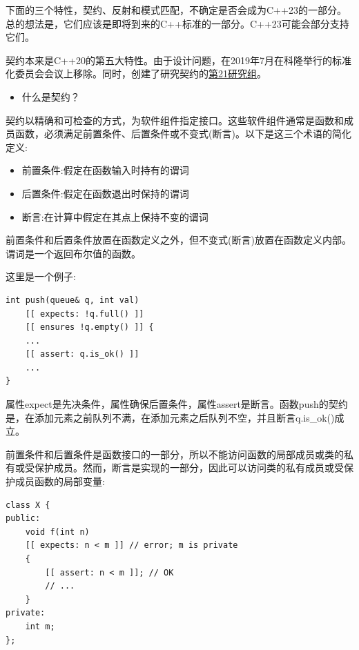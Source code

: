 
下面的三个特性，契约、反射和模式匹配，不确定是否会成为C++23的一部分。总的想法是，它们应该是即将到来的C++标准的一部分。C++23可能会部分支持它们。


契约本来是C++20的第五大特性。由于设计问题，在2019年7月在科隆举行的标准化委员会会议上移除。同时，创建了研究契约的\href{https://isocpp.org/std/the-committee}{第21研究组}。

\begin{itemize}
\item 
什么是契约？
\end{itemize}

契约以精确和可检查的方式，为软件组件指定接口。这些软件组件通常是函数和成员函数，必须满足前置条件、后置条件或不变式(断言)。以下是这三个术语的简化定义:

\begin{itemize}
\item 
前置条件:假定在函数输入时持有的谓词

\item 
后置条件:假定在函数退出时保持的谓词

\item 
断言:在计算中假定在其点上保持不变的谓词
\end{itemize}

前置条件和后置条件放置在函数定义之外，但不变式(断言)放置在函数定义内部。谓词是一个返回布尔值的函数。

这里是一个例子:

\begin{lstlisting}[style=styleCXX]
int push(queue& q, int val)
	[[ expects: !q.full() ]]
	[[ ensures !q.empty() ]] {
	...
	[[ assert: q.is_ok() ]]
	...
}
\end{lstlisting}

属性expect是先决条件，属性确保后置条件，属性assert是断言。函数push的契约是，在添加元素之前队列不满，在添加元素之后队列不空，并且断言q.is\_ok()成立。

前置条件和后置条件是函数接口的一部分，所以不能访问函数的局部成员或类的私有或受保护成员。然而，断言是实现的一部分，因此可以访问类的私有成员或受保护成员函数的局部变量:

\begin{lstlisting}[style=styleCXX]
class X {
public:
	void f(int n)
	[[ expects: n < m ]] // error; m is private
	{
		[[ assert: n < m ]]; // OK
		// ...
	}
private:
	int m;
};
\end{lstlisting}

